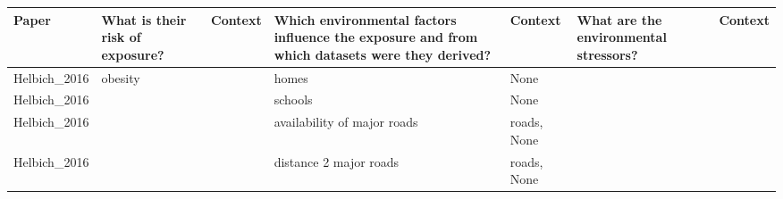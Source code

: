 \documentclass{article}
\begin{document}
\begin{table}
\centering
\begin{tabular}{lllllll} 
\toprule
Paper            & What is their risk of exposure?                                                                     & Context & Which environmental factors influence the exposure and from which datasets were they derived? & Context                                                                                                                                                                                          & What are the environmental stressors? & Context  \\ 
\midrule
Helbich\_2016    & obesity                                                                                             &         & homes                                                                                         & None                                                                                                                                                                                             &                                       &          \\
Helbich\_2016    &                                                                                                     &         & schools                                                                                       & None                                                                                                                                                                                             &                                       &          \\
Helbich\_2016    &                                                                                                     &         & availability of major roads                                                                   & roads, None                                                                                                                                                                                      &                                       &          \\
Helbich\_2016    &                                                                                                     &         & distance 2 major roads                                                                        & roads, None                                                                                                                                                                                      &                                       &          \\

\end{tabular}
\end{table}
\end{document}
